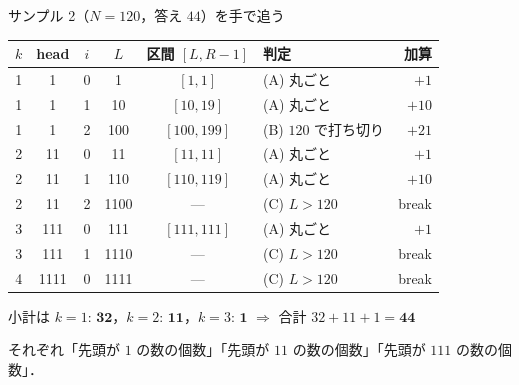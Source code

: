 \documentclass[dvipdfmx,aspectratio=169]{beamer}
\begin{document}
\begin{frame}{サンプル 2（$N=120$，答え $44$）を手で追う}
  \centering
  {\small
  \begin{tabular}{ccccclr}
    \toprule
    $k$ & head & $i$ & $L$ & 区間 $[L, R-1]$ & 判定 & 加算\\
    \midrule
    1 & 1 & 0 & 1 & $[1,1]$ & (A) 丸ごと & $+1$\\
    1 & 1 & 1 & 10 & $[10,19]$ & (A) 丸ごと & $+10$\\
    1 & 1 & 2 & 100 & $[100,199]$ & (B) $120$ で打ち切り & $+21$\\
    \midrule
    2 & 11 & 0 & 11 & $[11,11]$ & (A) 丸ごと & $+1$\\
    2 & 11 & 1 & 110 & $[110,119]$ & (A) 丸ごと & $+10$\\
    2 & 11 & 2 & 1100 & --- & (C) $L>120$ & break\\
    \midrule
    3 & 111 & 0 & 111 & $[111,111]$ & (A) 丸ごと & $+1$\\
    3 & 111 & 1 & 1110 & --- & (C) $L>120$ & break\\
    \midrule
    4 & 1111 & 0 & 1111 & --- & (C) $L>120$ & break\\
    \bottomrule
  \end{tabular}}

  \vspace{0.6em}
  \raggedright
  小計は $k=1$: $\mathbf{32}$，$k=2$: $\mathbf{11}$，$k=3$: $\mathbf{1}$
  $\Rightarrow$ 合計 $32+11+1 = \mathbf{44}$ \ \textcolor{ok}{\checkmark}

  {\small それぞれ「先頭が $1$ の数の個数」「先頭が $11$ の数の個数」「先頭が $111$ の数の個数」．}
\end{frame}
\end{document}
